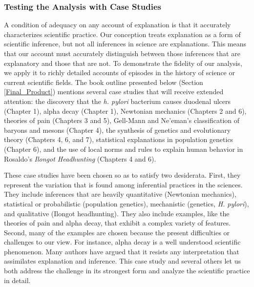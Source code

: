 \documentclass{article}[11pt]
\begin{document}
\subsubsection*{Testing the Analysis with Case Studies}

A condition of adequacy on any account of explanation is that it accurately characterizes scientific practice.  Our conception treats explanation as a form of scientific inference, but not all inferences in science are explanations.  This means that our account must accurately distinguish between those inferences that are explanatory and those that are not.  To demonstrate the fidelity of our analysis, we apply it to richly detailed accounts of episodes in the history of science or current scientific fields.  The book outline presented below (Section \ref{Final_Product}) mentions several case studies that will receive extended attention: the discovery that the \textit{h. pylori} bacterium causes duodenal ulcers (Chapter 1), alpha decay (Chapter 1), Newtonian mechanics (Chapters 2 and 6), theories of pain (Chapters 3 and 5),  Gell-Mann and Ne'eman's classification of baryons and mesons (Chapter 4), the synthesis of genetics and evolutionary theory (Chapters 4, 6, and 7), statistical explanations in population genetics (Chapter 6), and the use of local norms and rules to explain human behavior in Rosaldo's \textit{Ilongot Headhunting} (Chapters 4 and 6).

These case studies have been chosen so as to satisfy two desiderata.  First, they represent the variation that is found among inferential practices in the sciences. They include inferences that are heavily quantitative (Newtonian mechanics), statistical or probabilistic (population genetics), mechanistic (genetics, \textit{H. pylori}), and qualitative (Ilongot headhunting).  They also include examples, like the theories of pain and alpha decay, that exhibit a complex variety of features.  Second, many of the examples are chosen because the present difficulties or challenges to our view.  For instance, alpha decay is a well understood scientific phenomenon.  Many authors \citep{Hitchcock1999,Jeffrey1969,Salmon1970}  have argued that it resists any interpretation that assimilates explanation and inference.  This case study and several others let us both address the challenge in its strongest form and analyze the scientific practice in detail.
\end{document}
